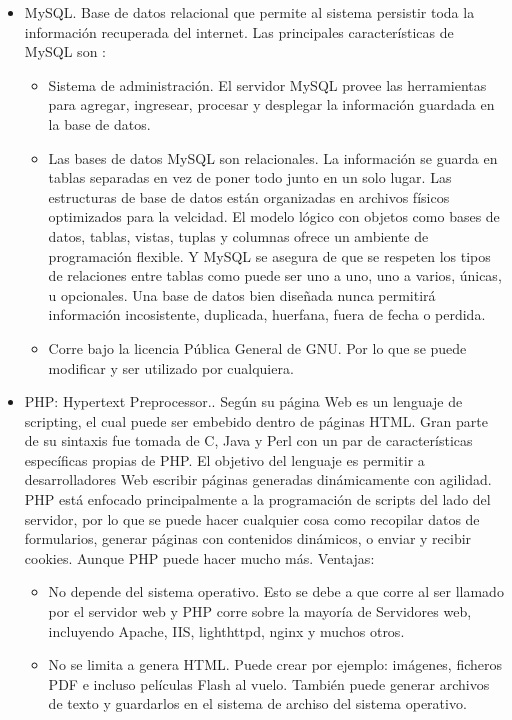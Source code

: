 \begin{itemize}
\begin{itemize}
		\item MySQL. Base de datos relacional que permite al sistema persistir toda la información recuperada del internet. Las principales características de MySQL son \cite{mysqlWeb}:
		\begin{itemize}
			\item Sistema de administración. El servidor MySQL provee las herramientas para agregar, ingresear, procesar y desplegar la información guardada en la base de datos.
			\item Las bases de datos MySQL son relacionales. La información se guarda en tablas separadas en vez de poner todo junto en un solo lugar. Las estructuras de base de datos están organizadas en archivos físicos optimizados para la velcidad. El modelo lógico con objetos como bases de datos, tablas, vistas, tuplas y columnas ofrece un ambiente de programación flexible. Y MySQL se asegura de que se respeten los tipos de relaciones entre tablas como puede ser uno a uno, uno a varios, únicas, u opcionales. Una base de datos bien diseñada nunca permitirá información incosistente, duplicada, huerfana, fuera de fecha o perdida.
			\item Corre bajo la licencia Pública General de GNU. Por lo que se puede modificar y ser utilizado por cualquiera.
		\end{itemize}
				\item PHP: Hypertext Preprocessor.. Según su página Web \cite{phpWeb} es un lenguaje de scripting, el cual puede ser embebido dentro de páginas HTML. Gran parte de su sintaxis fue tomada de C, Java y Perl con un par de características específicas propias de PHP. El objetivo del lenguaje es permitir a desarrolladores Web escribir páginas generadas dinámicamente con agilidad.
				 PHP está enfocado principalmente a la programación de scripts del lado del servidor, por lo que se puede hacer cualquier cosa como recopilar datos de formularios, generar páginas con contenidos dinámicos, o enviar y recibir cookies. Aunque PHP puede hacer mucho más.
				 Ventajas:
		 		\begin{itemize}
		 			\item No depende del sistema operativo. Esto se debe a que corre al ser llamado por el servidor web y PHP corre sobre la mayoría de Servidores web, incluyendo Apache, IIS, lighthttpd, nginx y muchos otros.
					\item No se limita a genera HTML. Puede crear por ejemplo: imágenes, ficheros PDF e incluso películas Flash al vuelo. También puede generar archivos de texto y guardarlos en el sistema de archiso del sistema operativo. 

\end{itemize}
\end{itemize}
\end{itemize}
